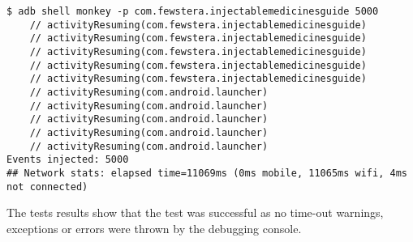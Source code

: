 \documentclass[11pt,fleqn,twoside]{article}
\begin{document}
\begin{verbatim}
$ adb shell monkey -p com.fewstera.injectablemedicinesguide 5000
    // activityResuming(com.fewstera.injectablemedicinesguide)
    // activityResuming(com.fewstera.injectablemedicinesguide)
    // activityResuming(com.fewstera.injectablemedicinesguide)
    // activityResuming(com.fewstera.injectablemedicinesguide)
    // activityResuming(com.fewstera.injectablemedicinesguide)
    // activityResuming(com.android.launcher)
    // activityResuming(com.android.launcher)
    // activityResuming(com.android.launcher)
    // activityResuming(com.android.launcher)
    // activityResuming(com.android.launcher)
Events injected: 5000
## Network stats: elapsed time=11069ms (0ms mobile, 11065ms wifi, 4ms not connected)
\end{verbatim}

The tests results show that the test was successful as no time-out warnings, exceptions or errors were thrown by the debugging console.
\end{document}

